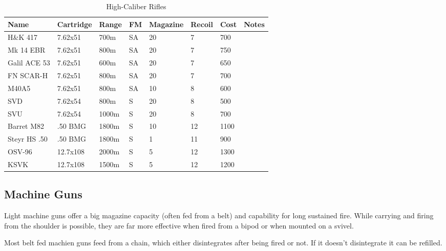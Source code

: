 \begin{table}
  \caption{High-Caliber Rifles}
  \begin{center}
    \begin{tabular}{| l | l | l | l | l | l | l | l |}
      \hline
      \textbf{Name} & \textbf{Cartridge} & \textbf{Range} &
      \textbf{FM} & \textbf{Magazine} & \textbf{Recoil} &
      \textbf{Cost} & \textbf{Notes} \\ \hline


      H\&K 417      & 7.62x51  &  700m & SA & 20 & 7  &  700 & \\ \hline
      Mk 14 EBR     & 7.62x51  &  800m & SA & 20 & 7  &  750 & \\ \hline
      Galil ACE 53  & 7.62x51  &  600m & SA & 20 & 7  &  650 & \\ \hline
      FN SCAR-H     & 7.62x51  &  800m & SA & 20 & 7  &  700 & \\ \hline
      M40A5         & 7.62x51  &  800m & SA & 10 & 8  &  600 & \\ \hline

      SVD           & 7.62x54  &  800m & S  & 20 & 8  &  500 & \\ \hline
      SVU           & 7.62x54  & 1000m & S  & 20 & 8  &  700 & \\ \hline

      Barret M82    & .50 BMG  & 1800m & S  & 10 & 12 & 1100 & \\ \hline
      Steyr HS .50  & .50 BMG  & 1800m & S  &  1 & 11 &  900 & \\ \hline

      OSV-96        & 12.7x108 & 2000m & S  &  5 & 12 & 1300 & \\ \hline
      KSVK          & 12.7x108 & 1500m & S  &  5 & 12 & 1200 & \\ \hline
    \end{tabular}
  \end{center}
\end{table}


\subsection{Machine Guns}

Light machine guns offer a big magazine capacity (often fed from a belt) and
capability for long sustained fire. While carrying and firing from the shoulder
is possible, they are far more effective when fired from a bipod or when mounted
on a svivel.

Most belt fed machien guns feed from a chain, which either disintegrates after
being fired or not. If it doesn't disintegrate it can be refilled.

